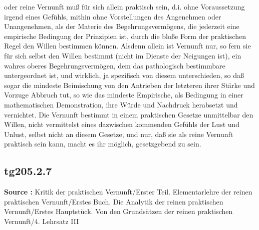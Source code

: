 \documentclass[a4paper,12pt,twoside]{book}
\begin{document}
oder reine Vernunft muß für sich allein praktisch sein, d.i. ohne Voraussetzung irgend eines Gefühls, mithin ohne Vorstellungen des Angenehmen oder Unangenehmen, als der Materie des Begehrungsvermögens, die jederzeit eine empirische Bedingung der Prinzipien ist, durch die bloße Form der praktischen Regel den Willen bestimmen können. Alsdenn allein ist Vernunft nur, so fern sie für sich selbst den Willen bestimmt (nicht im Dienste der Neigungen ist), ein wahres oberes Begehrungsvermögen, dem das pathologisch bestimmbare untergeordnet ist, und wirklich, ja spezifisch von diesem unterschieden, so daß sogar die mindeste Beimischung von den Antrieben der letzteren ihrer Stärke und Vorzuge Abbruch tut, so wie das mindeste Empirische, als Bedingung in einer mathematischen Demonstration, ihre Würde und Nachdruck herabsetzt und vernichtet. Die Vernunft bestimmt in einem praktischen Gesetze unmittelbar  den Willen, nicht vermittelst eines dazwischen kommenden Gefühls der Lust und Unlust, selbst nicht an diesem Gesetze, und nur, daß sie als reine Vernunft praktisch sein kann, macht es ihr möglich, gesetzgebend zu sein. 
	
	\subsection*{tg205.2.7} 
	\textbf{Source : }Kritik der praktischen Vernunft/Erster Teil. Elementarlehre der reinen praktischen Vernunft/Erstes Buch. Die Analytik der reinen praktischen Vernunft/Erstes Hauptstück. Von den Grundsätzen der reinen praktischen Vernunft/4. Lehrsatz III\\  
	
\end{document}
